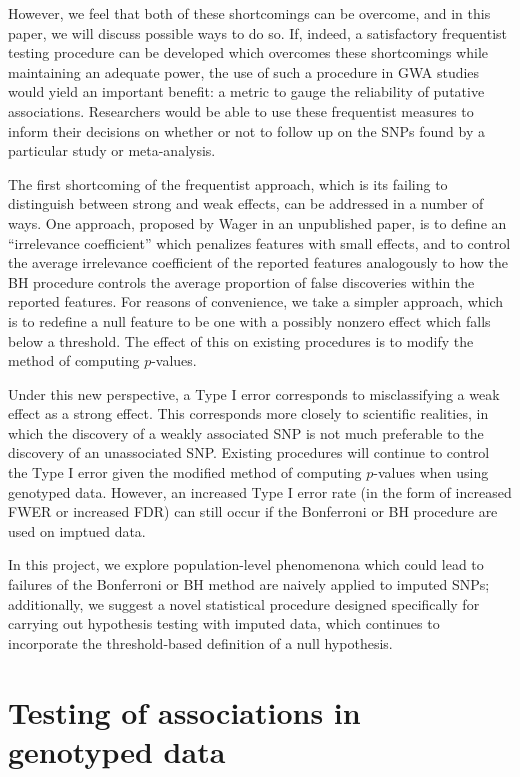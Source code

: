 \documentclass[12pt]{article}
\begin{document}
However, we feel that both of these shortcomings can be overcome,
and in this paper, we will discuss possible ways to do so.
If, indeed, a satisfactory frequentist testing procedure can be
developed which overcomes these shortcomings while maintaining
an adequate power,
the use of such a procedure in GWA studies would yield
an important benefit:
a metric to gauge the reliability of putative
associations.
Researchers
would be able to use these frequentist measures to inform
their decisions on whether or not to follow up on the SNPs found
by a particular study or meta-analysis.

The first shortcoming of the frequentist approach, which is its failing to
distinguish between strong and weak effects,
can be addressed in a number of ways.
One approach, proposed by Wager \cite{Wager2013a} in an
unpublished
paper, is to define an ``irrelevance coefficient'' which penalizes
features with small effects, and to control the average
irrelevance coefficient of the reported features
analogously to how the BH procedure controls the average proportion
of false discoveries within the reported features.
For reasons of convenience, we take a simpler approach,
which is to redefine a null feature to be one with a possibly
nonzero effect which falls below a threshold.
The effect of this on existing procedures is to modify
the method of computing $p$-values.

Under this new perspective, a Type I error
corresponds to misclassifying a weak effect as a strong effect.
This corresponds more closely to scientific realities,
in which the discovery of a weakly associated SNP is not much
preferable to the discovery of an unassociated SNP.
Existing procedures will continue to control the Type I error
given the modified method of computing $p$-values when using genotyped
data.
However, an increased Type I error rate (in the form of increased FWER
or increased FDR) can still occur if the Bonferroni or BH procedure
are used on imptued data.

In this project,
we explore population-level phenomenona which could lead
to failures of the Bonferroni or BH method
are naively applied to imputed SNPs;
additionally, we suggest a novel statistical procedure
designed specifically for carrying out hypothesis testing with imputed
data,
which continues to incorporate the threshold-based definition
of a null hypothesis.

\section{Testing of associations in genotyped data}
\end{document}
